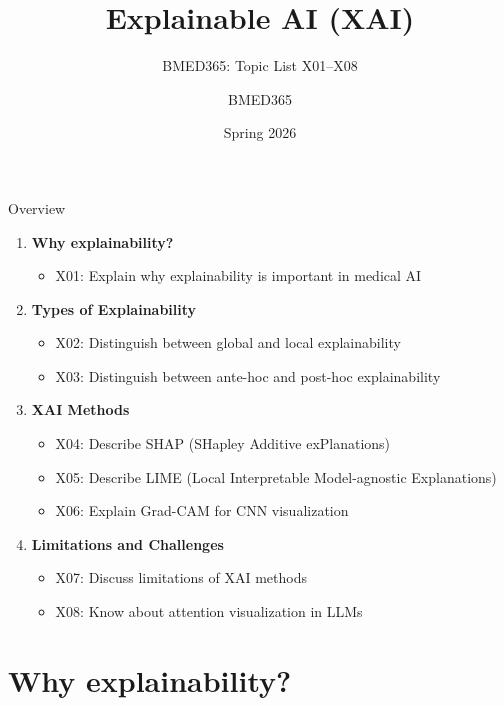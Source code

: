 \documentclass[aspectratio=169, 10pt]{beamer}
\title{Explainable AI (XAI)}
\subtitle{BMED365: Topic List X01--X08}
\author{BMED365}
\date{Spring 2026}
\begin{document}
\begin{frame}
    \titlepage
\end{frame}

\begin{frame}{Overview}
    \begin{enumerate}
        \item \textbf{Why explainability?}
        \begin{itemize}
            \item X01: Explain why explainability is important in medical AI
        \end{itemize}
        \item \textbf{Types of Explainability}
        \begin{itemize}
            \item X02: Distinguish between global and local explainability
            \item X03: Distinguish between ante-hoc and post-hoc explainability
        \end{itemize}
        \item \textbf{XAI Methods}
        \begin{itemize}
            \item X04: Describe SHAP (SHapley Additive exPlanations)
            \item X05: Describe LIME (Local Interpretable Model-agnostic Explanations)
            \item X06: Explain Grad-CAM for CNN visualization
        \end{itemize}
        \item \textbf{Limitations and Challenges}
        \begin{itemize}
            \item X07: Discuss limitations of XAI methods
            \item X08: Know about attention visualization in LLMs
        \end{itemize}
    \end{enumerate}
\end{frame}

\section{Why explainability?}
\end{document}
